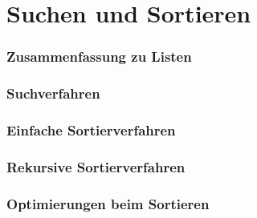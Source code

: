 \documentclass[handout]{beamer}
\subtitle{Such- und Sortierverfahren}
\begin{document}
\maketitle

\part{Suchen und Sortieren}

\section{Zusammenfassung zu Listen}
    

\section{Suchverfahren}
	

\section{Einfache Sortierverfahren}
	
\section{Rekursive Sortierverfahren}
	
\section{Optimierungen beim Sortieren}
	
\end{document}
